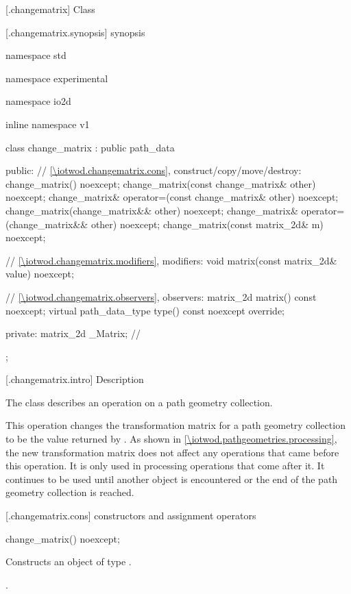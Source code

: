  [\iotwod.changematrix] {Class }

 [\iotwod.changematrix.synopsis] { synopsis}

\begin{codeblock}
namespace std { namespace experimental { namespace io2d { inline namespace v1 {
  class change_matrix : public path_data {
  public:
    // \ref{\iotwod.changematrix.cons}, construct/copy/move/destroy:
    change_matrix() noexcept;
    change_matrix(const change_matrix& other) noexcept;
    change_matrix& operator=(const change_matrix& other) noexcept;
    change_matrix(change_matrix&& other) noexcept;
    change_matrix& operator=(change_matrix&& other) noexcept;
    change_matrix(const matrix_2d& m) noexcept;

    // \ref{\iotwod.changematrix.modifiers}, modifiers:
    void matrix(const matrix_2d& value) noexcept;

    // \ref{\iotwod.changematrix.observers}, observers:
    matrix_2d matrix() const noexcept;
    virtual path_data_type type() const noexcept override;
    
  private:
    matrix_2d _Matrix; // \expos
  };
} } } }
\end{codeblock}

 [\iotwod.changematrix.intro] { Description}

\pnum
{}
The class  describes an operation on a path geometry collection.

\pnum
This operation changes the transformation matrix for a path geometry collection to be the value returned by . As shown in \ref{\iotwod.pathgeometries.processing}, the new transformation matrix does not affect any operations that came before this operation. It is only used in processing operations that come after it. It continues to be used until another  object is encountered or the end of the path geometry collection is reached.

 [\iotwod.changematrix.cons] { constructors and assignment operators}

\begin{itemdecl}
    change_matrix() noexcept;
\end{itemdecl}
\begin{itemdescr}
	\pnum
	\effects
	Constructs an object of type .
	
	\pnum
	\postconditions
	.
\end{itemdescr}


